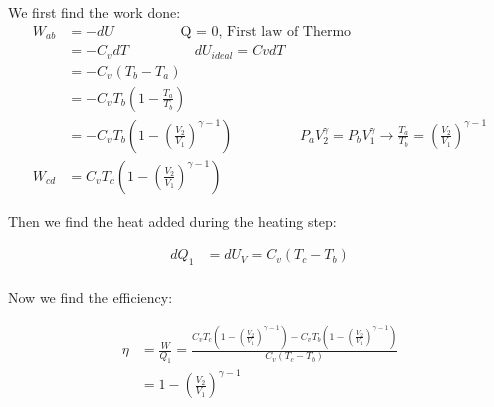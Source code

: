 \documentclass[10pt]{article} %
\begin{document}
We first find the work done:
\begin{align*}
  W_{ab} &= -dU \hspace{2cm}\mbox{Q = 0, First law of Thermo}\\
  &= -C_vdT \hspace{2cm}dU_{ideal} = CvdT\\
  &= -C_v\left(T_b-T_a\right)\\
  &= -C_vT_b\left(1-\frac{T_a}{T_b}\right)\\
  &= -C_vT_b\left(1-\left(\frac{V_2}{V_1}\right)^{\gamma-1}\right)
             \hspace{2cm}P_aV_2^\gamma = P_bV_1^\gamma \rightarrow
             \frac{T_a}{T_b} = \left(\frac{V_2}{V_1}\right)^{\gamma-1}\\
  W_{cd} &= C_vT_c\left(1 - \left(\frac{V_2}{V_1}\right)^{\gamma-1}\right)
\end{align*}

Then we find the heat added during the heating step:

\begin{align*}
  dQ_1 &= dU_V = C_v\left(T_c-T_b\right)\\
\end{align*}

Now we find the efficiency:

\begin{align*}
  \eta &= \frac{W}{Q_1} = \frac{C_vT_c\left(1 - \left(\frac{V_2}{V_1}\right)^{\gamma-1}\right)
    - C_vT_b\left(1-\left(\frac{V_2}{V_1}\right)^{\gamma-1}\right)}{C_v\left(T_c-T_b\right)}\\
  &= 1 - \left(\frac{V_2}{V_1}\right)^{\gamma-1}\\
\end{align*}
\end{document}
